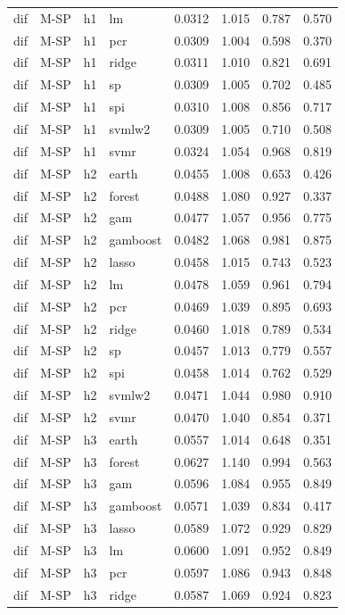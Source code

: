 \begin{ThreePartTable}
\begin{longtable}[t]{llclcccc}
dif & M-SP & h1 & lm & 0.0312 & 1.015 & 0.787 & 0.570\\
dif & M-SP & h1 & pcr & 0.0309 & 1.004 & 0.598 & 0.370\\
dif & M-SP & h1 & ridge & 0.0311 & 1.010 & 0.821 & 0.691\\
dif & M-SP & h1 & sp & 0.0309 & 1.005 & 0.702 & 0.485\\
dif & M-SP & h1 & spi & 0.0310 & 1.008 & 0.856 & 0.717\\
dif & M-SP & h1 & svmlw2 & 0.0309 & 1.005 & 0.710 & 0.508\\
dif & M-SP & h1 & svmr & 0.0324 & 1.054 & 0.968 & 0.819\\
\addlinespace
dif & M-SP & h2 & earth & 0.0455 & 1.008 & 0.653 & 0.426\\
dif & M-SP & h2 & forest & 0.0488 & 1.080 & 0.927 & 0.337\\
dif & M-SP & h2 & gam & 0.0477 & 1.057 & 0.956 & 0.775\\
dif & M-SP & h2 & gamboost & 0.0482 & 1.068 & 0.981 & 0.875\\
dif & M-SP & h2 & lasso & 0.0458 & 1.015 & 0.743 & 0.523\\
dif & M-SP & h2 & lm & 0.0478 & 1.059 & 0.961 & 0.794\\
dif & M-SP & h2 & pcr & 0.0469 & 1.039 & 0.895 & 0.693\\
dif & M-SP & h2 & ridge & 0.0460 & 1.018 & 0.789 & 0.534\\
dif & M-SP & h2 & sp & 0.0457 & 1.013 & 0.779 & 0.557\\
dif & M-SP & h2 & spi & 0.0458 & 1.014 & 0.762 & 0.529\\
dif & M-SP & h2 & svmlw2 & 0.0471 & 1.044 & 0.980 & 0.910\\
dif & M-SP & h2 & svmr & 0.0470 & 1.040 & 0.854 & 0.371\\
\addlinespace
dif & M-SP & h3 & earth & 0.0557 & 1.014 & 0.648 & 0.351\\
dif & M-SP & h3 & forest & 0.0627 & 1.140 & 0.994 & 0.563\\
dif & M-SP & h3 & gam & 0.0596 & 1.084 & 0.955 & 0.849\\
dif & M-SP & h3 & gamboost & 0.0571 & 1.039 & 0.834 & 0.417\\
dif & M-SP & h3 & lasso & 0.0589 & 1.072 & 0.929 & 0.829\\
dif & M-SP & h3 & lm & 0.0600 & 1.091 & 0.952 & 0.849\\
dif & M-SP & h3 & pcr & 0.0597 & 1.086 & 0.943 & 0.848\\
dif & M-SP & h3 & ridge & 0.0587 & 1.069 & 0.924 & 0.823\\

\end{longtable}
\end{ThreePartTable}
